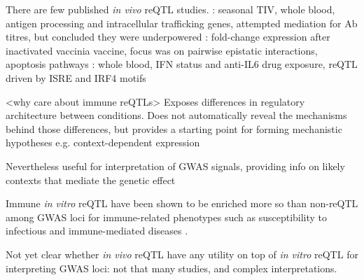 \begin{outline}
    \2 There are few published \textit{in vivo} \gls{reQTL} studies.
        \3 \autocite{franco2013IntegrativeGenomicAnalysis}: seasonal \gls{TIV}, whole blood, antigen processing and intracellular trafficking genes, attempted mediation for Ab titres, but concluded they were underpowered
        \3 \autocite{lareau2016InteractionQuantitativeTrait}: fold-change expression after inactivated vaccinia vaccine, focus was on pairwise epistatic interactions, apoptosis pathways
        \3 \autocite{davenport2018DiscoveringVivoCytokineeQTL}: whole blood, IFN status and anti-IL6 drug exposure, reQTL driven by ISRE and IRF4 motifs

\1 <why care about immune reQTLs>
    \2 Exposes differences in regulatory architecture between conditions. 
    \2 Does not automatically reveal the mechanisms behind those differences, but provides a starting point for forming mechanistic hypotheses e.g. context-dependent expression

    \2 Nevertheless useful for interpretation of GWAS signals, providing info on likely contexts that mediate the genetic effect

    \2 Immune \textit{in vitro} \gls{reQTL} have been shown to be enriched more so than non-\gls{reQTL} among GWAS loci for immune-related phenotypes such as
    susceptibility to infectious \autocite{barreiro2012DecipheringGeneticArchitecture,manry2017DecipheringGeneticControl}
    and immune-mediated diseases \autocite{manry2017DecipheringGeneticControl,kim-hellmuth2017GeneticRegulatoryEffects}.


    \2 Not yet clear whether \textit{in vivo} reQTL have any utility on top of \textit{in vitro} reQTL for interpreting GWAS loci: not that many studies, and complex interpretations.


\end{outline}
